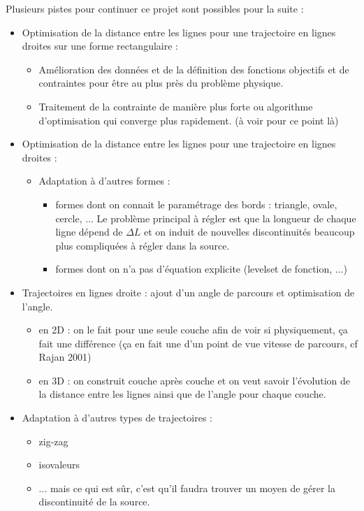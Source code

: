 \documentclass[11pt,a4paper]{article}
\begin{document}
Plusieurs pistes pour continuer ce projet sont possibles pour la suite :

\begin{itemize}
	\item Optimisation de la distance entre les lignes pour une trajectoire en lignes droites sur une forme rectangulaire :
	\begin{itemize}
		\item Amélioration des données et de la définition des fonctions objectifs et de contraintes pour être au plus près du problème physique.
		\item Traitement de la contrainte de manière plus forte ou algorithme d'optimisation qui converge plus rapidement. (à voir pour ce point là)
	\end{itemize}
	
	\item Optimisation de la distance entre les lignes pour une trajectoire en lignes droites :
	\begin{itemize}
		\item Adaptation à d'autres formes :
		\begin{itemize}
			\item formes dont on connait le paramétrage des bords : triangle, ovale, cercle, ... Le problème principal à régler est que la longueur de chaque ligne dépend de $\Delta L$ et on induit de nouvelles discontinuités beaucoup plus compliquées à régler dans la source.
			\item formes dont on n'a pas d'équation explicite (levelset de fonction, ...)
		\end{itemize}
	\end{itemize}
	
	\item Trajectoires en lignes droite : ajout d'un angle de parcours et optimisation de l'angle.
	\begin{itemize}
		\item en 2D : on le fait pour une seule couche afin de voir si physiquement, ça fait une différence (ça en fait une d'un point de vue vitesse de parcours, cf Rajan 2001)
		\item en 3D : on construit couche après couche et on veut savoir l'évolution de la distance entre les lignes ainsi que de l'angle pour chaque couche.
	\end{itemize}
	
	\item Adaptation à d'autres types de trajectoires :
	\begin{itemize}
		\item zig-zag
		\item isovaleurs
		\item ... mais ce qui est sûr, c'est qu'il faudra trouver un moyen de gérer la discontinuité de la source.
	\end{itemize}
\end{itemize}
\end{document}
